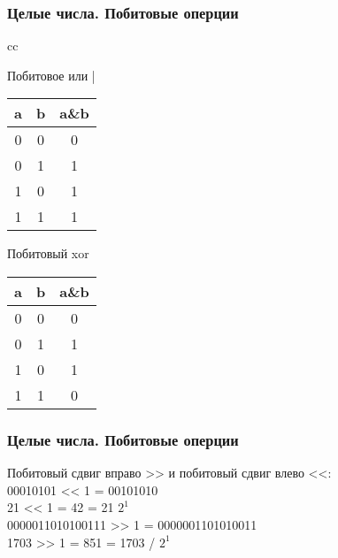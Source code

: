 
\begin{frame}
    \frametitle{Целые числа. Побитовые оперции}

    \begin{tabular}{cc}
        \begin{minipage}{.5\linewidth}
            \begin{table}[h!]
                Побитовое или | \\
                \begin{tabular}{|c|c|c|}
                    \hline
                    a & b & a\&b \\[0.5ex]
                    \hline\hline
                    0 & 0 & 0  \\
                    0 & 1 & 1  \\
                    1 & 0 & 1  \\
                    1 & 1 & 1  \\
                    \hline
                \end{tabular}
            \end{table}
        \end{minipage}

        \begin{minipage}{.4\linewidth}
            \begin{table}[h!]
                Побитовый xor \^ \\
                \begin{tabular}{|c|c|c|}
                    \hline
                    a & b & a\&b \\[0.5ex]
                    \hline\hline
                    0 & 0 & 0  \\
                    0 & 1 & 1  \\
                    1 & 0 & 1  \\
                    1 & 1 & 0  \\
                    \hline
                \end{tabular}
            \end{table}
        \end{minipage}
    \end{tabular}
\end{frame}


\begin{frame}
    \frametitle{Целые числа. Побитовые оперции}

    \begin{center}
        Побитовый сдвиг вправо >> и побитовый сдвиг влево <<: \\
        00010101 << 1 = 00101010 \\
        21 << 1 = 42 = 21 \times $2^1$ \\
        0000011010100111 >> 1 = 0000001101010011 \\
        1703 >> 1 = 851 = 1703 / $2^1$ \\
    \end{center}

\end{frame}


